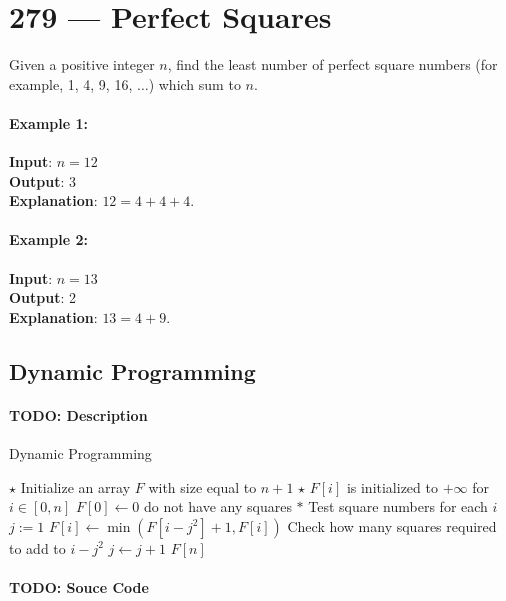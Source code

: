 \section{279 --- Perfect Squares}
Given a positive integer $n$, find the least number of perfect square numbers (for example, 1, 4, 9, 16, $\ldots$) which sum to $n$.

\paragraph{Example 1:}
\begin{flushleft}
\textbf{Input}: $n = 12$
\\
\textbf{Output}: 3 
\\
\textbf{Explanation}: $12 = 4 + 4 + 4$.
\end{flushleft}

\paragraph{Example 2:}
\begin{flushleft}
\textbf{Input}: $n = 13$
\\
\textbf{Output}: 2
\\
\textbf{Explanation}: $13 = 4 + 9$.
\end{flushleft}
\subsection{Dynamic Programming}
\paragraph{TODO: Description}
\setcounter{algorithm}{0}
\begin{algorithm}[H]
\caption{Dynamic Programming}
\begin{algorithmic}[1]
\State $\star$ Initialize an array $F$ with size equal to $n+1$
\State $\star$ $F[i]$ is initialized to $+\infty$ for $i\in[0,n]$
\State $F[0]\gets 0$  do not have any squares
\State $\ast$ Test square numbers for each $i$
\State $j:=1$
\State $F[i]\gets \min(F[i-j^2]+1, F[i])$ \Comment Check how many squares required to add to $i-j^2$
\State $j\gets j+1$
\EndWhile
\EndFor
\State \Return $F[n]$
\EndProcedure
\end{algorithmic}
\end{algorithm}
\paragraph{TODO: Souce Code}